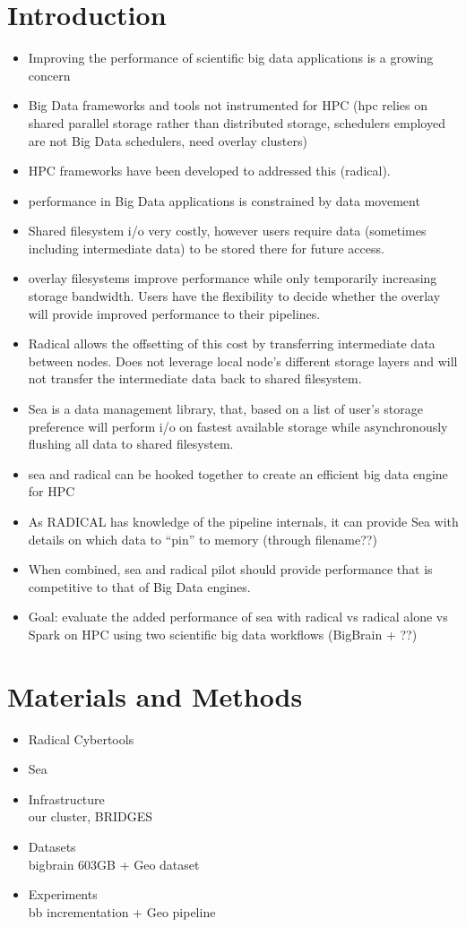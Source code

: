 \documentclass[conference]{IEEEtran}
\begin{document}
\section{Introduction}
\begin{itemize}
\item Improving the performance of scientific big data applications is a growing concern
\item Big Data frameworks and tools not instrumented for HPC (hpc relies on shared parallel storage rather than distributed storage, schedulers employed are not Big Data schedulers, need overlay clusters)
\item HPC frameworks have been developed to addressed this (radical).
\item performance in Big Data applications is constrained by data movement
\item Shared filesystem i/o very costly, however users require data (sometimes including intermediate data) to be stored there for future access.
\item overlay filesystems improve performance while only temporarily increasing
    storage bandwidth. Users have the flexibility to decide whether the overlay
    will provide improved performance to their pipelines.
\item Radical allows the offsetting of this cost by transferring intermediate data between nodes. Does not leverage local node's different storage layers and will not transfer the intermediate data back to shared filesystem.
\item Sea is a data management library, that, based on a list of user's storage preference will perform i/o on fastest available storage while asynchronously flushing all data to shared filesystem.
\item sea and radical can be hooked together to create an efficient big data engine for HPC
\item As RADICAL has knowledge of the pipeline internals, it can provide Sea with details on which data to ``pin'' to memory (through filename??)
\item When combined, sea and radical pilot should provide performance that is competitive to that of Big Data engines.
\item Goal: evaluate the added performance of sea with radical vs radical alone vs Spark on HPC using two scientific big data workflows (BigBrain + ??)
\end{itemize}
\section{Materials and Methods}
\begin{itemize}
    \item{Radical Cybertools}
    \item{Sea}
    \item{Infrastructure} \\our cluster, BRIDGES
    \item{Datasets} \\ bigbrain 603GB + Geo dataset
    \item{Experiments} \\ bb incrementation + Geo pipeline
\end{itemize}
\end{document}
